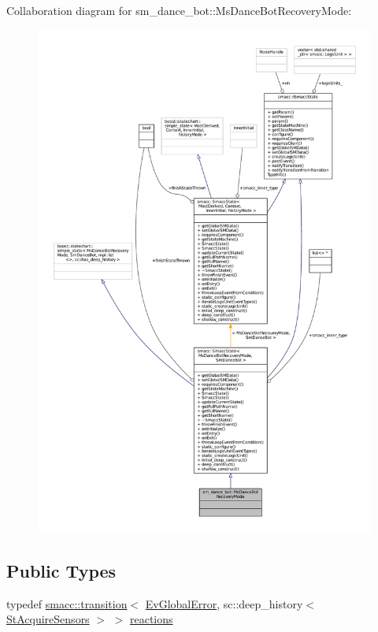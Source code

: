 Collaboration diagram for sm\+\_\+dance\+\_\+bot\+:\+:Ms\+Dance\+Bot\+Recovery\+Mode\+:
\nopagebreak
\begin{figure}[H]
\begin{center}
\leavevmode
\includegraphics[width=350pt]{classsm__dance__bot_1_1MsDanceBotRecoveryMode__coll__graph}
\end{center}
\end{figure}
\subsection*{Public Types}
\begin{DoxyCompactItemize}
\item 
typedef \hyperlink{classsmacc_1_1transition}{smacc\+::transition}$<$ \hyperlink{structsm__dance__bot_1_1EvGlobalError}{Ev\+Global\+Error}, sc\+::deep\+\_\+history$<$ \hyperlink{structsm__dance__bot_1_1StAcquireSensors}{St\+Acquire\+Sensors} $>$ $>$ \hyperlink{classsm__dance__bot_1_1MsDanceBotRecoveryMode_ab51767685284085079620cb13b1e81a1}{reactions}
\end{DoxyCompactItemize}
